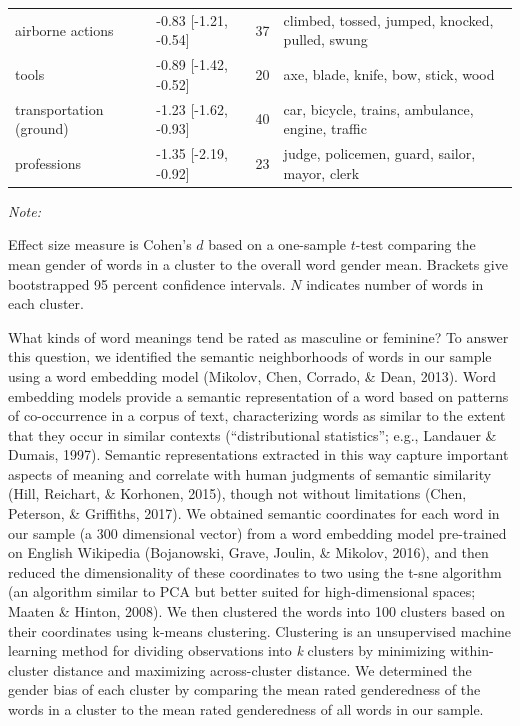 \documentclass[
  english,
  ,man,floatsintext]{apa6}
\begin{document}
\begin{table}
{\begin{threeparttable}
\begin{tabular}[t]{llrl}
\hspace{1em}airborne actions & -0.83 [-1.21, -0.54] & 37 & climbed, tossed, jumped, knocked, pulled, swung\\
\hspace{1em}tools & -0.89 [-1.42, -0.52] & 20 & axe, blade, knife, bow, stick, wood\\
\hspace{1em}transportation (ground) & -1.23 [-1.62, -0.93] & 40 & car, bicycle, trains, ambulance, engine, traffic\\
\hspace{1em}professions & -1.35 [-2.19, -0.92] & 23 & judge, policemen, guard, sailor, mayor, clerk\\
\bottomrule
\end{tabular}
\begin{tablenotes}[para]
\item \textit{Note:} 
\item Effect size measure is Cohen's $d$ based on a one-sample $t$-test comparing the mean gender of words in a cluster to the overall word gender mean. Brackets give bootstrapped 95 percent confidence intervals. $N$ indicates number of words in each cluster.
\end{tablenotes}
\end{threeparttable}}
\end{table}

What kinds of word meanings tend be rated as masculine or feminine? To answer this question, we identified the semantic neighborhoods of words in our sample using a word embedding model (Mikolov, Chen, Corrado, \& Dean, 2013). Word embedding models provide a semantic representation of a word based on patterns of co-occurrence in a corpus of text, characterizing words as similar to the extent that they occur in similar contexts (``distributional statistics''; e.g., Landauer \& Dumais, 1997). Semantic representations extracted in this way capture important aspects of meaning and correlate with human judgments of semantic similarity (Hill, Reichart, \& Korhonen, 2015), though not without limitations (Chen, Peterson, \& Griffiths, 2017). We obtained semantic coordinates for each word in our sample (a 300 dimensional vector) from a word embedding model pre-trained on English Wikipedia (Bojanowski, Grave, Joulin, \& Mikolov, 2016), and then reduced the dimensionality of these coordinates to two using the t-sne algorithm (an algorithm similar to PCA but better suited for high-dimensional spaces; Maaten \& Hinton, 2008). We then clustered the words into 100 clusters based on their coordinates using k-means clustering. Clustering is an unsupervised machine learning method for dividing observations into \emph{k} clusters by minimizing within-cluster distance and maximizing across-cluster distance. We determined the gender bias of each cluster by comparing the mean rated genderedness of the words in a cluster to the mean rated genderedness of all words in our sample.
\end{document}
